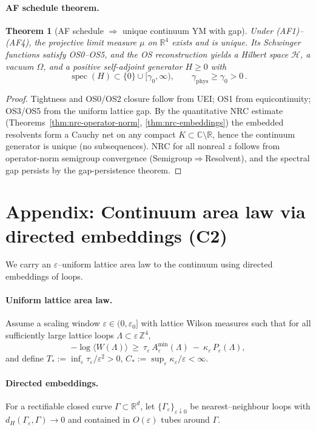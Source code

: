 \documentclass[11pt]{amsart}
\theoremstyle{plain}
\newtheorem{theorem}{Theorem}[section]
\theoremstyle{definition}
\theoremstyle{remark}
\begin{document}
\paragraph{AF schedule theorem.}
\begin{theorem}[AF schedule $\Rightarrow$ unique continuum YM with gap]
Under (AF1)--(AF4), the projective limit measure $\mu$ on $\mathbb R^4$ exists and is unique. Its Schwinger functions satisfy OS0--OS5, and the OS reconstruction yields a Hilbert space $\mathcal H$, a vacuum $\Omega$, and a positive self-adjoint generator $H\ge 0$ with
\[
  \operatorname{spec}(H)\subset\{0\}\cup[\gamma_0,\infty),\qquad \gamma_{\mathrm{phys}}\ge \gamma_0>0\,.
\]
\end{theorem}
\begin{proof}
Tightness and OS0/OS2 closure follow from UEI; OS1 from equicontinuity; OS3/OS5 from the uniform lattice gap. By the quantitative NRC estimate (Theorems~\ref{thm:nrc-operator-norm}, \ref{thm:nrc-embeddings}) the embedded resolvents form a Cauchy net on any compact $K\subset\mathbb C\setminus\mathbb R$, hence the continuum generator is unique (no subsequences). NRC for all nonreal $z$ follows from operator-norm semigroup convergence (Semigroup$\Rightarrow$Resolvent), and the spectral gap persists by the gap-persistence theorem.
\end{proof}
\section{Appendix: Continuum area law via directed embeddings (C2)}

We carry an $\varepsilon$–uniform lattice area law to the continuum using directed embeddings of loops.

\paragraph{Uniform lattice area law.}
Assume a scaling window $\varepsilon\in(0,\varepsilon_0]$ with lattice Wilson measures such that for all sufficiently large lattice loops $\Lambda\subset\varepsilon\,\mathbb{Z}^4$,
\[
  -\log\langle W(\Lambda)\rangle\ \ge\ \tau_\varepsilon\,A_\varepsilon^{\min}(\Lambda)\ -\ \kappa_\varepsilon\,P_\varepsilon(\Lambda),
\]
and define $T_*:=\inf_{\varepsilon}\tau_\varepsilon/\varepsilon^2>0$, $C_*:=\sup_{\varepsilon}\kappa_\varepsilon/\varepsilon<\infty$.
\paragraph{Directed embeddings.}
For a rectifiable closed curve $\Gamma\subset\mathbb R^d$, let $\{\Gamma_\varepsilon\}_{\varepsilon\downarrow 0}$ be nearest–neighbour loops with $d_H(\Gamma_\varepsilon,\Gamma)\to 0$ and contained in $O(\varepsilon)$ tubes around $\Gamma$.
\end{document}

